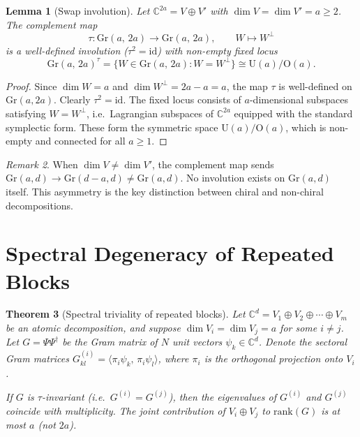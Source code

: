 \documentclass[12pt]{amsart}
\newtheorem{theorem}{Theorem}[section]
\newtheorem{lemma}[theorem]{Lemma}
\theoremstyle{definition}
\theoremstyle{remark}
\newtheorem{remark}[theorem]{Remark}
\newcommand{\CC}{\mathbb{C}}
\newcommand{\Gr}{\mathrm{Gr}}
\begin{document}
\begin{lemma}[Swap involution]
\label{lem:swap}
Let $\CC^{2a} = V \oplus V'$ with
$\dim V = \dim V' = a \ge 2$.
The complement map
\begin{equation}
\tau \colon \Gr(a,\, 2a) \to \Gr(a,\, 2a),
\qquad W \mapsto W^{\perp}
\end{equation}
is a well-defined involution ($\tau^2 = \mathrm{id}$)
with non-empty fixed locus
\begin{equation}
\Gr(a,\, 2a)^{\tau}
= \{ W \in \Gr(a,\, 2a) : W = W^{\perp} \}
\cong \mathrm{U}(a) / \mathrm{O}(a).
\end{equation}
\end{lemma}

\begin{proof}
Since $\dim W = a$ and $\dim W^{\perp} = 2a - a = a$,
the map $\tau$ is well-defined on $\Gr(a, 2a)$.
Clearly $\tau^2 = \mathrm{id}$.
The fixed locus consists of $a$-dimensional
subspaces satisfying $W = W^{\perp}$, i.e.\
Lagrangian subspaces of $\CC^{2a}$ equipped
with the standard symplectic form.
These form the symmetric space
$\mathrm{U}(a)/\mathrm{O}(a)$,
which is non-empty and connected for all $a \ge 1$.
\end{proof}

\begin{remark}
\label{rem:asymmetric}
When $\dim V \ne \dim V'$,
the complement map sends
$\Gr(a, d) \to \Gr(d - a, d) \ne \Gr(a, d)$.
No involution exists on $\Gr(a, d)$ itself.
This asymmetry is the key distinction
between chiral and non-chiral decompositions.
\end{remark}

\section{Spectral Degeneracy of Repeated Blocks}
\label{sec:degeneracy}

\begin{theorem}[Spectral triviality of repeated blocks]
\label{thm:spectral_trivial}
Let $\CC^d = V_1 \oplus V_2 \oplus \cdots \oplus V_m$
be an atomic decomposition, and suppose
$\dim V_i = \dim V_j = a$ for some $i \ne j$.
Let $G = \Psi \Psi^{\dagger}$ be the Gram matrix
of $N$ unit vectors $\psi_k \in \CC^d$.
Denote the sectoral Gram matrices
$G^{(i)}_{kl} = \langle \pi_i \psi_k,\, \pi_i \psi_l \rangle$,
where $\pi_i$ is the orthogonal projection onto $V_i$.

If $G$ is $\tau$-invariant
(i.e.\ $G^{(i)} = G^{(j)}$), then the
eigenvalues of $G^{(i)}$ and $G^{(j)}$
coincide with multiplicity.
The joint contribution of $V_i \oplus V_j$
to $\mathrm{rank}(G)$ is at most $a$
(not $2a$).
\end{theorem}
\end{document}
